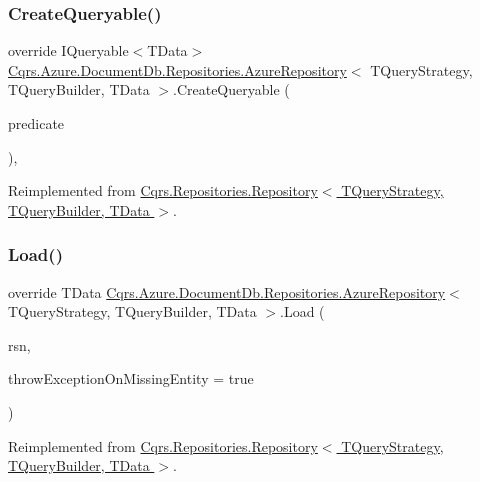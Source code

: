 \subsubsection{\texorpdfstring{Create\+Queryable()}{CreateQueryable()}}
{\footnotesize\ttfamily override I\+Queryable$<$T\+Data$>$ \hyperlink{classCqrs_1_1Azure_1_1DocumentDb_1_1Repositories_1_1AzureRepository}{Cqrs.\+Azure.\+Document\+Db.\+Repositories.\+Azure\+Repository}$<$ T\+Query\+Strategy, T\+Query\+Builder, T\+Data $>$.Create\+Queryable (\begin{DoxyParamCaption}\item[{Expression$<$ Func$<$ T\+Data, bool $>$$>$}]{predicate }\end{DoxyParamCaption})\hspace{0.3cm}{\ttfamily [protected]}, {\ttfamily [virtual]}}



Reimplemented from \hyperlink{classCqrs_1_1Repositories_1_1Repository_ab95fc66b24e8359a1e2f48a3ca2f14c1_ab95fc66b24e8359a1e2f48a3ca2f14c1}{Cqrs.\+Repositories.\+Repository$<$ T\+Query\+Strategy, T\+Query\+Builder, T\+Data $>$}.

\mbox{\label{classCqrs_1_1Azure_1_1DocumentDb_1_1Repositories_1_1AzureRepository_a22c58163e101a6cb80f891bed6114380_a22c58163e101a6cb80f891bed6114380}} 
\subsubsection{\texorpdfstring{Load()}{Load()}}
{\footnotesize\ttfamily override T\+Data \hyperlink{classCqrs_1_1Azure_1_1DocumentDb_1_1Repositories_1_1AzureRepository}{Cqrs.\+Azure.\+Document\+Db.\+Repositories.\+Azure\+Repository}$<$ T\+Query\+Strategy, T\+Query\+Builder, T\+Data $>$.Load (\begin{DoxyParamCaption}\item[{Guid}]{rsn,  }\item[{bool}]{throw\+Exception\+On\+Missing\+Entity = {\ttfamily true} }\end{DoxyParamCaption})\hspace{0.3cm}{\ttfamily [virtual]}}



Reimplemented from \hyperlink{classCqrs_1_1Repositories_1_1Repository_a444e9dfe4710be90940dbb6dec9d856f_a444e9dfe4710be90940dbb6dec9d856f}{Cqrs.\+Repositories.\+Repository$<$ T\+Query\+Strategy, T\+Query\+Builder, T\+Data $>$}.

